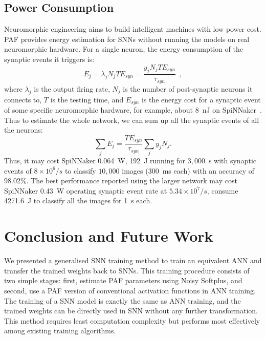 \documentclass{article}
\begin{document}
\subsection{Power Consumption}
Neuromorphic engineering aims to build intelligent machines with low power cost.
PAF provides energy estimation for SNNs without running the models on real neuromorphic hardware.
For a single neuron, the energy consumption of the synaptic events it triggers is:
\begin{equation}
E_{j} = \lambda_j N_j T E_{syn} = \dfrac{y_j N_j T E_{syn}}{\tau_{syn}}~~,
\label{equ:energy}
\end{equation}
where $\lambda_j$ is the output firing rate, $N_j$ is the number of post-synaptic neurons it connects to, $T$ is the testing time, and $E_{syn}$ is the energy cost for a synaptic event of some specific neuromorphic hardware, for example, about 8~nJ on SpiNNaker~\cite{stromatias2013power}.
Thus to estimate the whole network, we can sum up all the synaptic events of all the neurons:
\begin{equation}
\sum_j E_{j} =  \dfrac{T E_{syn}}{\tau_{syn}} \sum_{j}y_j N_j.
\end{equation}
Thus, it may cost SpiNNaker 0.064~W, 192~J running for $3,000$~s with synaptic events of $8\times10^6/s$ to classify $10,000$ images (300~ms each) with an accuracy of 98.02\%.
The best performance reported using the larger network may cost SpiNNaker 0.43~W operating synaptic event rate at $5.34\times10^7/s$, consume 4271.6~J to classify all the images for 1~s each.

\section{Conclusion and Future Work}
We presented a generalised SNN training method to train an equivalent ANN and transfer the trained weights back to SNNs.
This training procedure consists of two simple stages: first, estimate PAF parameters using Noisy Softplus, and second, use a PAF version of conventional activation functions in ANN training. %
The training of a SNN model is exactly the same as ANN training, and the trained weights can be directly used in SNN without any further transformation.
This method requires least computation complexity but performs most effectively among existing training algorithms.
\end{document}

